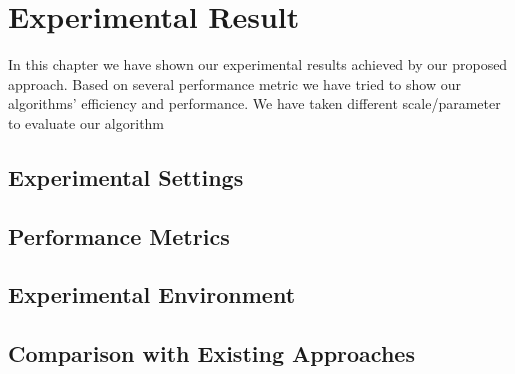 %
\chapter{Experimental Result}
In this chapter we have shown our experimental results achieved by our proposed approach. Based on several performance metric we have tried to show our algorithms' efficiency and performance. We have taken different scale/parameter to evaluate our algorithm
\section{Experimental Settings}

\section{Performance Metrics}

\section{Experimental Environment}

\nopagebreak[2]
\section{Comparison with Existing Approaches}

%
%